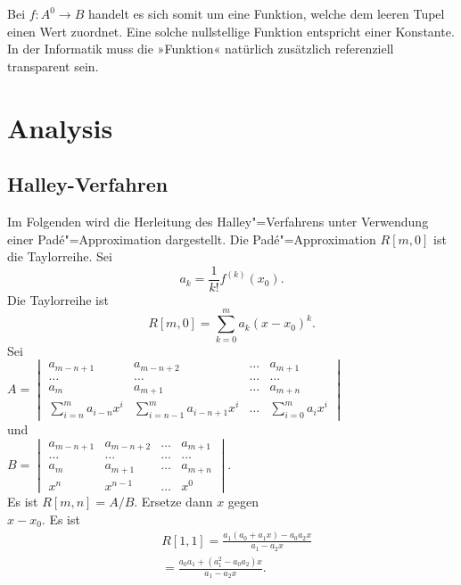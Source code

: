 \documentclass[a4paper,10pt,fleqn,twocolumn,twoside]{scrartcl}
\numberwithin{equation}{section}
\begin{document}
Bei $f\colon A^0\to B$ handelt es sich somit um eine Funktion, welche
dem leeren Tupel einen Wert zuordnet. Eine solche nullstellige
Funktion entspricht einer Konstante. In der Informatik muss die
»Funktion« natürlich zusätzlich referenziell transparent sein.

\newpage
\section{Analysis}
\subsection{Halley-Verfahren}
Im Folgenden wird die Herleitung des Halley"=Verfahrens unter
Verwendung einer Padé"=Approximation dargestellt.
Die Padé"=Approximation $R[m,0]$ ist die Taylorreihe. Sei
\begin{equation}
a_k = \frac{1}{k!} f^{(k)}(x_0).
\end{equation}
Die Taylorreihe ist
\begin{equation}
R[m,0] = \sum_{k=0}^m a_k(x-x_0)^k.
\end{equation}
Sei\\
\(A=\begin{vmatrix}
a_{m-n+1} & a_{m-n+2} & \ldots & a_{m+1}\\
\ldots & \ldots & \ldots & \ldots\\
a_m & a_{m+1} & \ldots & a_{m+n}\\
\sum\limits_{i=n}^m a_{i-n}x^i &
\sum\limits_{i=n-1}^m a_{i-n+1}x^i
&\ldots & \sum\limits_{i=0}^m a_i x^i
\end{vmatrix}\)\\
und\\
\(B=\begin{vmatrix}
a_{m-n+1} & a_{m-n+2} & \ldots & a_{m+1}\\
\ldots &\ldots &\ldots &\ldots\\
a_m & a_{m+1} &\ldots & a_{m+n}\\
x^n & x^{n-1} &\ldots & x^0
\end{vmatrix}\).\\
Es ist $R[m,n]=A/B$.
Ersetze dann $x$ gegen\\
$x-x_0$. Es ist
\begin{equation}
\begin{split}
& R[1,1] = \frac{a_1(a_0+a_1 x)-a_0a_2x}{a_1-a_2x}\\
& = \frac{a_0a_1+(a_1^2-a_0a_2)x}{a_1-a_2x}.
\end{split}
\end{equation}
\end{document}
